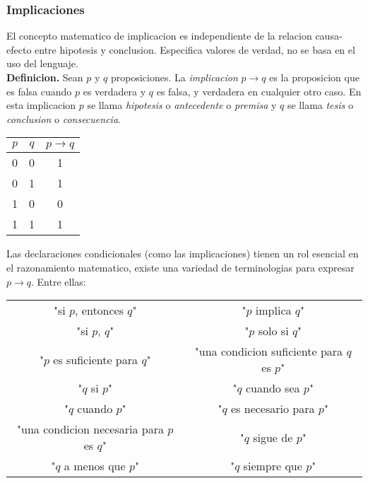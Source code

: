 \documentclass[]{article}
\begin{document}
\subsubsection*{Implicaciones}

El concepto matematico de implicacion es independiente de la relacion causa-efecto entre hipotesis y conclusion. Especifica valores de verdad, no se basa en el uso del lenguaje.\\

\textbf{Definicion.} Sean $p$ y $q$ proposiciones. La \textit{implicacion} $p \rightarrow q$ es la proposicion que es falsa cuando $p$ es verdadera y $q$ es falsa, y verdadera en cualquier otro caso. En esta implicacion $p$ se llama \textit{hipotesis} o \textit{antecedente} o \textit{premisa} y $q$ se llama \textit{tesis} o \textit{conclusion} o \textit{consecuencia}.\\

	\begin{table}[H]
		\begin{center}
			\label{tab:then}
			\begin{tabular}{cc|c}
				$p$ & $q$ & $p \rightarrow q$ \\
				\hline
				0 & 0 & 1 \\
				0 & 1 & 1 \\
				1 & 0 & 0 \\
				1 & 1 & 1 \\
			\end{tabular}
		\end{center}
	\end{table}

	Las declaraciones condicionales (como las implicaciones) tienen un rol esencial en el razonamiento matematico, existe una variedad de terminologias para expresar $p \rightarrow q$. Entre ellas:

	\begin{table}[H]
		\begin{center}
			\begin{tabular}{c c}
				"si $p$, entonces $q$" & "$p$ implica $q$"\\
				"si $p$, $q$" & "$p$ solo si $q$"\\
				"$p$ es suficiente para $q$" & "una condicion suficiente para $q$ es $p$"\\
				"$q$ si $p$" & "$q$ cuando sea $p$"\\
				"$q$ cuando $p$" & "$q$ es necesario para $p$"\\
				"una condicion necesaria para $p$ es $q$" & "$q$ sigue de $p$"\\
				"$q$ a menos que $p$" & "$q$ siempre que $p$"\\
			\end{tabular}
		\end{center}
	\end{table}
\end{document}
